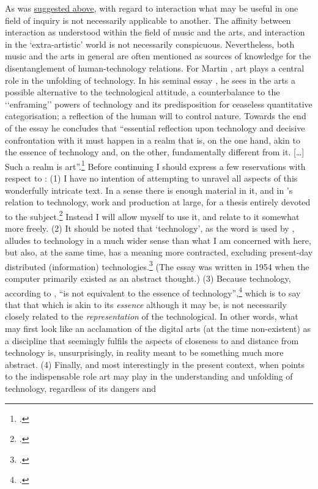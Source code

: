 
\label{sec:inter-defin:par3}
\hypertarget{par:inter-defin:3}{As was} \hyperlink{sec:target:interraction-self-1}{suggested above}, with regard to interaction what may be useful in one field of inquiry is not necessarily applicable to another. The affinity between interaction as understood within the field of music and the arts, and interaction in the `extra-artistic' world is not necessarily conspicuous. Nevertheless, both music and the arts in general are often mentioned as sources of knowledge for the disentanglement of human-technology relations. For Martin \citeauthor{heidegger93}, art plays a central role in the unfolding of technology. In his seminal essay , he sees in the arts a possible alternative to the technological attitude, a counterbalance to the ``enframing'' powers of technology and its predisposition for ceaseless quantitative categorisation; a reflection of the human will to control nature. Towards the end of the essay he concludes that ``essential reflection upon technology and decisive confrontation with it must happen in a realm that is, on the one hand, akin to the essence of technology and, on the other, fundamentally different from it. [\ldots] Such a realm is art''.\footcite[340]{heidegger93} Before continuing I should express a few reservations with respect to : (1) I have no intention of attempting to unravel all aspects of this wonderfully intricate text. In a sense there is enough material in it, and in \citeauthor{heidegger93}'s relation to technology, work and production at large, for a thesis entirely devoted to the subject.\footcite[An example of this is Zimmerman's well-informed book on Heidegger and modernity:][]{zimmerman90} Instead I will allow myself to use it, and relate to it somewhat more freely. (2) It should be noted that `technology', as the word is used by \citeauthor{heidegger93}, alludes to technology in a much wider sense than what I am concerned with here, but also, at the same time, has a meaning more contracted, excluding present-day distributed (information) technologies.\footcite[See][26-9]{kemp91} (The essay was written in 1954 when the computer primarily existed as an abstract thought.) (3) Because technology, according to \citeauthor{heidegger93}, ``is not equivalent to the essence of technology'',\footcite[311]{heidegger93} which is to say that that which is akin to its \emph{essence} although it may be, is not necessarily closely related to the \emph{representation} of the technological. In other words, what may first look like an acclamation of the digital arts (at the time non-existent) as a discipline that seemingly fulfils the aspects of closeness to and distance from technology is, unsurprisingly, in reality meant to be something much more abstract. (4) Finally, and most interestingly in the present context, when \citeauthor{heidegger93} points to the indispensable role art may play in the understanding and unfolding of technology, regardless of its dangers and 